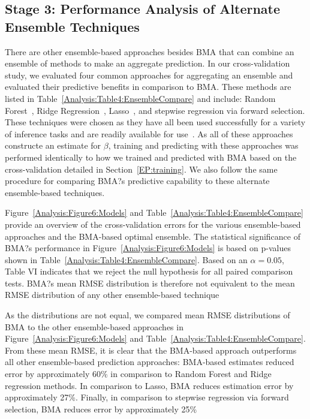 \documentclass[12pt]{article}
\newcommand{\+}[1]{\ensuremath{\mathbf{#1}}}
\begin{document}
\subsection{Stage 3: Performance Analysis of Alternate Ensemble Techniques}
\label{Results:BMA_Variants}
There are other ensemble-based approaches besides BMA that can combine an ensemble of methods to make an aggregate prediction. In our cross-validation study, we evaluated four common approaches for aggregating an ensemble and evaluated their predictive benefits in comparison to BMA. These methods are listed in Table~\ref{Analysis:Table4:EnsembleCompare} and include: Random Forest~\cite{Breiman:2001}, Ridge Regression~\cite{Hoerl:2000}, Lasso~\cite{Tibshirani:1994}, and stepwise regression via forward selection. These techniques were chosen as they have all been used successfully for a variety of inference tasks and are readily available for use~\cite{R:2008,sklearn_api:2013}. As all of these approaches constructe an estimate for $\beta$, training and predicting with these approaches was performed identically to how we trained and predicted with BMA based on the cross-validation detailed in Section~\ref{EP:training}. We also follow the same procedure for comparing BMA?s predictive capability to these alternate ensemble-based techniques.

Figure~\ref{Analysis:Figure6:Models} and Table~\ref{Analysis:Table4:EnsembleCompare} provide an overview of the cross-validation errors for the various ensemble-based approaches and the BMA-based optimal ensemble. The statistical significance of BMA?s performance in Figure~\ref{Analysis:Figure6:Models} is based on p-values shown in Table~\ref{Analysis:Table4:EnsembleCompare}. Based on an $\alpha = 0.05$, Table VI indicates that we reject the null hypothesis for all paired comparison tests. BMA?s mean RMSE distribution is therefore not equivalent to the mean RMSE distribution of any other ensemble-based technique

As the distributions are not equal, we compared mean RMSE distributions of BMA to the other ensemble-based approaches in Figure~\ref{Analysis:Figure6:Models} and Table~\ref{Analysis:Table4:EnsembleCompare}. From these mean RMSE, it is clear that the BMA-based approach outperforms all other ensemble-based prediction approaches: BMA-based estimates reduced error by approximately 60\% in comparison to Random Forest and Ridge regression methods. In comparison to Lasso, BMA reduces estimation error by approximately 27\%. Finally, in comparison to stepwise regression via forward selection, BMA reduces error by approximately 25\%
\end{document}
